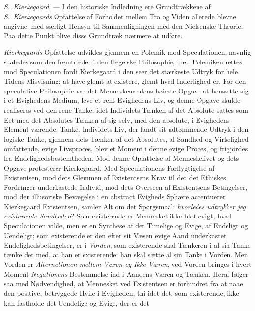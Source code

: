 \documentclass[12pt,a4paper]{book}
\newcommand{\opage}[1]{\marginnote{\footnotesize\textit{[#1]}}}
\begin{document}
\emph{S.\ Kierkegaard}. --- I den historiske Indledning ere Grundtrækkene af \emph{S.\ Kierkegaards}
Opfattelse af Forholdet mellem Tro og Viden allerede blevne angivne,
med særligt Hensyn til Sammenligningen med den Nielsenske Theorie. Paa
dette Punkt blive disse Grundtræk nærmere at udføre.

\emph{Kierkegaards} Opfattelse udvikles gjennem en Polemik mod Speculationen,
navnlig saaledes som den fremtræder i den Hegelske Philosophie; men
Polemiken rettes mod Speculationen fordi Kierkegaard i den seer det
stærkeste Udtryk for hele Tidens Misvisning: at have glemt at existere,
glemt hvad Inderlighed er. For den speculative Philosophie var det
Menneskeaandens høieste Opgave at hensætte sig i et Evighedens Medium,
leve et rent Evighedens Liv, og denne Opgave skulde realiseres ved den
rene Tanke, idet Individets Tænken af det Absolute sattes som Eet med
det Absolutes Tænken af sig selv, med den absolute, i Evighedens
Element værende, Tanke. Individets Liv, der fandt sit udtømmende Udtryk
i den logiske Tanke, gjennem dets Tænken af det Absolutes, al Sandhed
og Virkelighed omfattende, evige Livsproces, blev et Moment i denne
evige Proces, og frigjordes fra Endelighedsbestemtheden. Mod denne
\opage{119}Opfattelse af Menneskelivet og dets Opgave protesterer Kierkegaard.
Mod Speculationens Forflygtigelse af Existentsen, mod dets Glemmen af
Existentsens Krav til det det Ethiskes Fordringer underkastede Individ,
mod dets Overseen af Existentsens Betingelser, mod den illusoriske
Bevægelse i en abstract Evigheds Sphære accentuerer Kierkegaard
Existentsen, samler Alt om det Spørgsmaal: \emph{hvorledes udtrykker jeg
existerende Sandheden}? Som existerende er Mennesket ikke blot evigt,
hvad Speculationen vilde, men er en Synthese af det Timelige og Evige,
af Endeligt og Uendeligt; som existerende er den efter sit Væsen evige
Aand underkastet Endelighedsbetingelser, er i \emph{Vorden}; som existerende
skal Tænkeren i al sin Tanke tænke det med, at han er existerende; han
skal sætte al sin Tanke i Vorden. Men Vorden er \emph{Alternationen mellem Væren og Ikke-Væren}, ved Vorden bringes i hvert Moment \emph{Negationens} Bestemmelse ind i Aandens Væren og Tænken. Heraf følger saa med
Nødvendighed, at Mennesket ved Existentsen er forhindret fra at naae
den positive, betryggede Hvile i Evigheden, thi idet det, som
existerende, ikke kan fastholde det Uendelige og Evige, der er det
\end{document}
